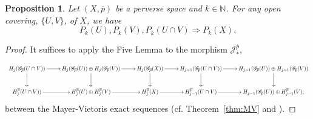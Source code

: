 \documentclass[a4paper,10pt,english,reqno]{amsart}
\theoremstyle{plain}
\newtheorem{proposition}{Proposition}[section]
\theoremstyle{definition}
\theoremstyle{remark}
\numberwithin{equation}{section}
\newcommand{\thmref}[1]{Theorem~\ref{#1}}
\def\ov{\overline}
\def\cJ{{\mathcal J}}
\def\crG{{\mathscr G}}
\def\N{\mathbb{N}}
\renewcommand\1{\hbox{\ding{192}}}
\renewcommand\2{\hbox{\ding{193}}}
\newcommand\3{\hbox{\ding{194}}}
\newcommand\4{\hbox{\ding{195}}}
\begin{document}
\begin{proposition}\label{MV}
Let  $(X,\ov p)$ be a perverse space and $k\in \N$. 
For any open covering,  $\{U,V\}$, of $X$, we have
$$
P_k(U), P_k(V), P_k(U\cap V) \Longrightarrow P_k(X).
$$
\end{proposition}
\begin{proof}
It suffices to apply the Five Lemma to  the morphism $\cJ^{\ov{p}}_{*}$,
$$
\scalebox{0.7}{
\xymatrix{
H_j(\crG_{\ov p}(U\cap V) ) \ar[r]  \ar[d]
& H_j(\crG_{\ov p}(U ) )  \oplus H_j(\crG_{\ov p}( V) )  \ar[r]  \ar[d]
& 
H_j(\crG_{\ov p}(X ) ) \ar[r]  \ar[d]
%
&
H_{j-1}(\crG_{\ov p}(U\cap V) ) \ar[r] \ar[d]
%
& H_{j-1}(\crG_{\ov p}(U ) )  \oplus H_{j-1}(\crG_{\ov p}( V) ) \ar[d]
\\
H_j^{\ov p}(U\cap V) ) \ar[r] & H_j^{\ov p}(U )   \oplus H_j^{\ov p}( V)   \ar[r] & 
H_j^{\ov p}(X) \ar[r]  
&
H_{j-1}^{\ov p}(U\cap V)  \ar[r]& H_{j-1}(\crG_{\ov p}(U ) )  \oplus H_{j-1}^{\ov p} ( V), 
}
}
$$
between the Mayer-Vietoris  exact sequences (cf. \thmref{thm:MV} and 
\cite[Theorem 1]{CST8}). 
\end{proof}
\end{document}
